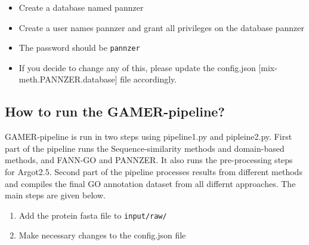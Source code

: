 \documentclass[11pt,letterpaper]{article}
\begin{document}
\begin{itemize}

 \item
       Create a database named pannzer
 \item
       Create a user names pannzer and grant all privileges on the database
       pannzer
 \item
       The password should be \texttt{pannzer}
 \item
       If you decide to change any of this, please update the config.json
       {[}mix-meth.PANNZER.database{]} file accordingly.
\end{itemize}

\subsection{How to run the
 GAMER-pipeline?}\label{how-to-run-the-gamer-pipeline}

GAMER-pipeline is run in two steps using pipeline1.py and pipleine2.py.
First part of the pipeline runs the Sequence-similarity methods and
domain-based methods, and FANN-GO and PANNZER. It also runs the
pre-processing steps for Argot2.5. Second part of the pipeline processes
results from different methods and compiles the final GO annotation
dataset from all differnt approaches. The main steps are given below.

\begin{enumerate}
 \def\labelenumi{\arabic{enumi}.}

 \item
       Add the protein fasta file to \texttt{input/raw/}
 \item
       Make necessary changes to the config.json file
\end{enumerate}
\end{document}
